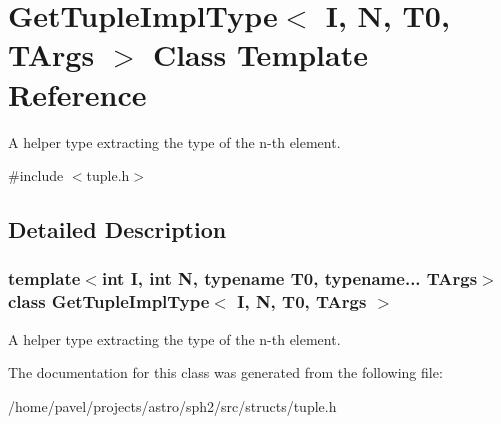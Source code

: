 \hypertarget{classGetTupleImplType}{}\section{Get\+Tuple\+Impl\+Type$<$ I, N, T0, T\+Args $>$ Class Template Reference}
\label{classGetTupleImplType}


A helper type extracting the type of the n-\/th element.  




{\ttfamily \#include $<$tuple.\+h$>$}



\subsection{Detailed Description}
\subsubsection*{template$<$int I, int N, typename T0, typename... T\+Args$>$\newline
class Get\+Tuple\+Impl\+Type$<$ I, N, T0, T\+Args $>$}

A helper type extracting the type of the n-\/th element. 

The documentation for this class was generated from the following file\+:\begin{DoxyCompactItemize}
\item 
/home/pavel/projects/astro/sph2/src/structs/tuple.\+h\end{DoxyCompactItemize}
